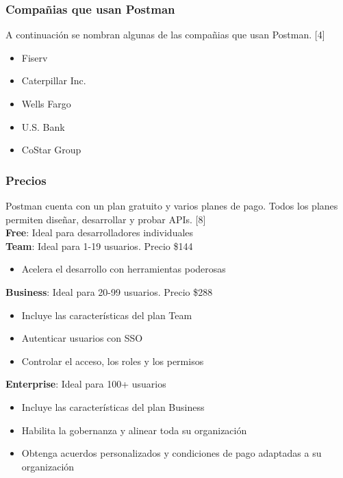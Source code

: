 \documentclass[twoside,twocolumn]{article}
\begin{document}
\subsubsection{Compañias que usan Postman}

A continuación se nombran algunas de las compañias que usan Postman. [4]

\begin{itemize}
  \item Fiserv
  \item Caterpillar Inc.
  \item Wells Fargo
  \item U.S. Bank
  \item CoStar Group
\end{itemize}

\subsubsection{Precios}

Postman cuenta con un plan gratuito y varios planes de pago. Todos los planes permiten diseñar, desarrollar y probar APIs. [8] \\

\textbf{Free}: Ideal para desarrolladores individuales \\

\textbf{Team}: Ideal para 1-19 usuarios. Precio \$144 \\

\begin{itemize}
  \item Acelera el desarrollo con herramientas poderosas
\end{itemize}

\textbf{Business}: Ideal para 20-99 usuarios. Precio \$288 \\

\begin{itemize}
  \item Incluye las características del plan Team
  \item Autenticar usuarios con SSO
  \item Controlar el acceso, los roles y los permisos
\end{itemize}

\textbf{Enterprise}: Ideal para 100+ usuarios \\

\begin{itemize}
  \item Incluye las características del plan Business
  \item Habilita la gobernanza y alinear toda su organización
  \item Obtenga acuerdos personalizados y condiciones de pago adaptadas a su organización
\end{itemize}
\end{document}
